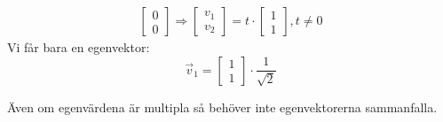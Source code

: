 \begin{Ex}
\begin{gather*}
		\begin{bmatrix} 0\\0 \end{bmatrix} \Rightarrow
		\begin{bmatrix} v_1\\v_2 \end{bmatrix} = 
		t \cdot \begin{bmatrix} 1\\1 \end{bmatrix} , t \neq 0
	\end{gather*}
	Vi får bara en egenvektor:
	\[
	\vec{v}_1 = \begin{bmatrix} 1\\1 \end{bmatrix} \cdot \frac{1}{\sqrt{2}}
	\]
\end{Ex}
Även om egenvärdena är multipla så behöver inte egenvektorerna sammanfalla.
\newpage
